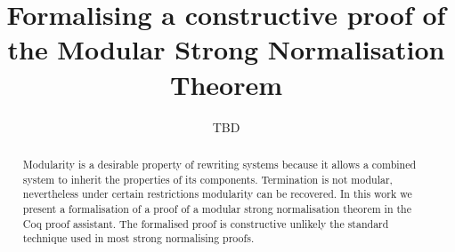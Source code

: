 \documentclass[12pt]{llncs}
\title{Formalising a constructive proof of the Modular Strong Normalisation Theorem}
\author{TBD}
\begin{document}
\maketitle

\begin{abstract}
  Modularity is a desirable property of rewriting systems because it allows a combined system to inherit the properties of its components. Termination is not modular, nevertheless under certain restrictions modularity can be recovered. In this work we present a formalisation of a proof of a modular strong normalisation theorem in the Coq proof assistant. The formalised proof is constructive unlikely the standard technique used in most strong normalising proofs.
\end{abstract}

\thispagestyle{empty}
\mbox{}\vfill







\clearpage

%

\end{document}
